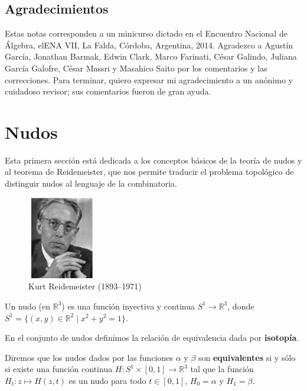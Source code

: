 \documentclass[graybox]{svmult}
\newcommand{\R}{\mathbb{R}}
\begin{document}
\subsection*{Agradecimientos}

Estas notas corresponden a un minicurso dictado en el Encuentro Nacional de
Álgebra, elENA VII, La Falda, Córdoba, Argentina, 2014.  Agradezco a Agustín
García, Jonathan Barmak, Edwin Clark, Marco Farinati, César Galindo, Juliana
García Galofre, César Massri y Masahico Saito por los comentarios y las
correcciones. Para terminar, quiero expresar mi agradecimiento a un anónimo y
cuidadoso revisor; sus comentarios fueron de gran ayuda. 

\section{Nudos}
\label{section:knots}

Esta primera sección está dedicada a los conceptos básicos de la teoría de
nudos y al teorema de Reidemeister, que nos permite traducir el problema
topológico de distinguir nudos al lenguaje de la combinatoria. 

\begin{figure}[h]
	\centering
    \includegraphics[width=30mm,height=36mm]{images/reidemeister}
    \caption{Kurt Reidemeister (1893--1971)}
\end{figure}

\begin{definition}
    Un nudo (en $\R^3$) es 
	una función inyectiva y continua $S^1\to\R^3$, donde
	$S^1=\{(x,y)\in\R^2\mid x^2+y^2=1\}$. 
\end{definition}

En el conjunto de nudos definimos la relación de equivalencia dada por
\textbf{isotopía}. 

\begin{definition}
	Diremos que los nudos dados por las funciones $\alpha$ y $\beta$ son
	\textbf{equivalentes} si y sólo si existe una función continua $H\colon
	S^1\times[0,1]\to\R^3$ tal que la función $H_t\colon z\mapsto H(z,t)$ es un
	nudo para todo $t\in [0,1]$, $H_0=\alpha$ y $H_1=\beta$. 
\end{definition}
\end{document}
